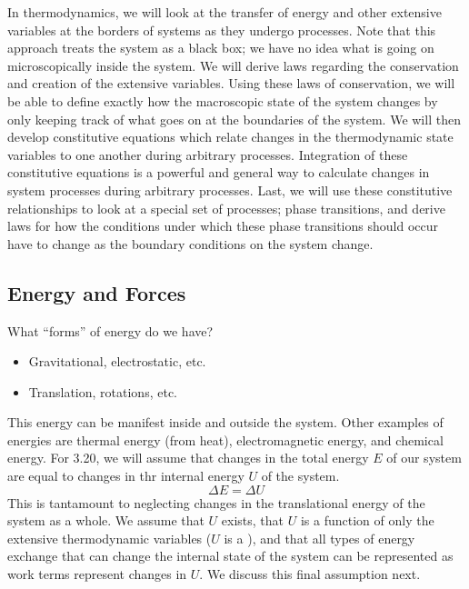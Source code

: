 \documentclass[12pt]{article}
\begin{document}
In thermodynamics, we will look at the transfer of energy and other extensive variables at the borders of systems as they undergo processes. Note that this approach treats the system as a black box; we have no idea what is going on microscopically inside the system. We will derive laws regarding the conservation and creation of the extensive variables. Using these laws of conservation, we will be able to define exactly how the macroscopic state of the system changes by only keeping track of what goes on at the boundaries of the system. We will then develop constitutive equations which relate changes in the thermodynamic state variables to one another during arbitrary processes. Integration of these constitutive equations is a powerful and general way to calculate changes in system processes during arbitrary processes. Last, we will use these constitutive relationships to look at a special set of processes; phase transitions, and derive laws for how the conditions under which these phase transitions should occur have to change as the boundary conditions on the system change.

\subsection{Energy and Forces}
What ``forms'' of energy do we have?
\begin{itemize}
\item {} Gravitational, electrostatic, etc.
\item {} Translation, rotations, etc.  
\end{itemize}
This energy can be manifest inside and outside the system.  Other examples of energies are thermal energy (from heat), electromagnetic energy, and chemical energy.
For 3.20, we will assume that changes in the total energy $E$ of our system are equal to changes in thr internal energy $U$ of the system.
\begin{equation}
\Delta E = \Delta U
\end{equation}
This is tantamount to neglecting changes in the translational energy of the system as a whole. We assume that $U$ exists, that $U$ is a function of only the extensive thermodynamic variables ($U$ is a ), and that all types of energy exchange that can change the internal state of the system can be represented as work terms represent changes in $U$. We discuss this final assumption next.
\end{document}
